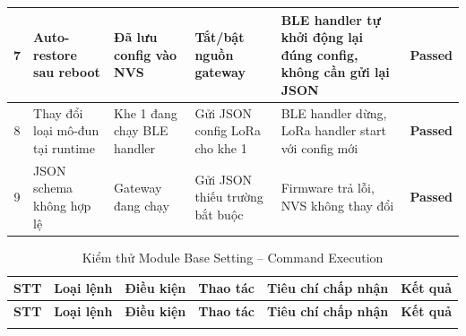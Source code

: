 \begin{longtable}{|c|p{}|p{}|p{}|p{}|c|}
            7 & Auto-restore sau reboot & Đã lưu config vào NVS & Tắt/bật nguồn gateway & BLE handler tự khởi động lại đúng config, không cần gửi lại JSON & \textcolor{modern_blue}{\textbf{Passed}} \\ \hline
            8 & Thay đổi loại mô-đun tại runtime & Khe 1 đang chạy BLE handler & Gửi JSON config LoRa cho khe 1 & BLE handler dừng, LoRa handler start với config mới & \textcolor{modern_blue}{\textbf{Passed}} \\ \hline
            9 & JSON schema không hợp lệ & Gateway đang chạy & Gửi JSON thiếu trường bắt buộc & Firmware trả lỗi, NVS không thay đổi & \textcolor{modern_blue}{\textbf{Passed}} \\ \hline
        \end{longtable}
        
        \begin{longtable}{|c|p{}|p{}|p{}|p{}|c|}
            \caption{Kiểm thử Module Base Setting -- Command Execution}
            \label{tab:test_module_base_command} \\
            \hline
            \textbf{STT} & \textbf{Loại lệnh} & \textbf{Điều kiện} & \textbf{Thao tác} & \textbf{Tiêu chí chấp nhận} & \textbf{Kết quả} \\ \hline
            \endfirsthead
            \hline
            \textbf{STT} & \textbf{Loại lệnh} & \textbf{Điều kiện} & \textbf{Thao tác} & \textbf{Tiêu chí chấp nhận} & \textbf{Kết quả} \\ \hline
            \endhead
            \hline
            \endfoot
            \endlastfoot
        

\end{longtable}
